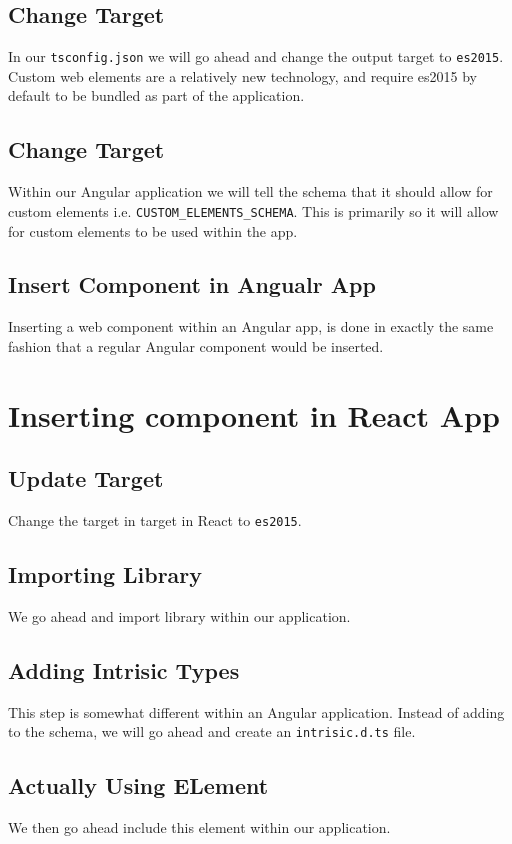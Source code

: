 \subsection{Change Target}
In our \lstinline{tsconfig.json} we will go ahead and change the output target to \lstinline{es2015}. Custom web elements are a relatively new technology, and require es2015 by default to be bundled as part of the application. 

\subsection{Change Target}
Within our Angular application we will tell the schema that it should allow for custom elements i.e. \lstinline{CUSTOM_ELEMENTS_SCHEMA}. This is primarily so it will allow for custom elements to be used within the app. 

\subsection{Insert Component in Angualr App}
Inserting a web component within an Angular app, is done in exactly the same fashion that a regular Angular component would be inserted. 

\section{Inserting component in React App}

\subsection{Update Target}
Change the target in target in React to \lstinline{es2015}.

\subsection{Importing Library}
We go ahead and import library within our application. 

\subsection{Adding Intrisic Types}                                              
This step is somewhat different within an Angular application. Instead of adding to the schema, we will go ahead and create an \lstinline{intrisic.d.ts} file. 

\subsection{Actually Using ELement}
We then go ahead include this element within our application. 